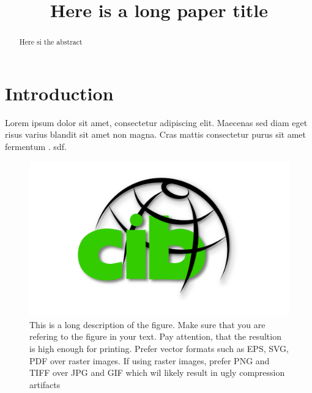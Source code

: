 
\geometry{top=3cm, bottom=2.5cm, left=3cm, right=3cm} %

\title{Here is a long paper title} 

\newcommand{\shorttitle}{My Short Paper Title}
\newcommand{\authorname}{Your Name}



\maketitle


\begin{abstract}
Here si the abstract
\end{abstract}

\thispagestyle{empty}

\section{Introduction}
Lorem ipsum dolor sit amet, consectetur adipiscing elit. Maecenas sed diam eget risus varius blandit sit amet non magna. Cras mattis consectetur purus sit amet fermentum \parencite{sample_citation1}. sdf.
\lipsum[5]
\begin{figure}[h!]
  \centering
  \includegraphics[width=\textwidth]{img/CIB_logo_gross.png}

  \caption{This is a long description of the figure. Make sure that 
  you are refering to the figure in your text. Pay attention, that the resultion is high enough for printing. Prefer vector formats such as EPS, SVG, PDF over raster images. If using raster images, prefer PNG and TIFF over JPG and GIF which wil likely result in ugly compression artifacts} 
\end{figure}


